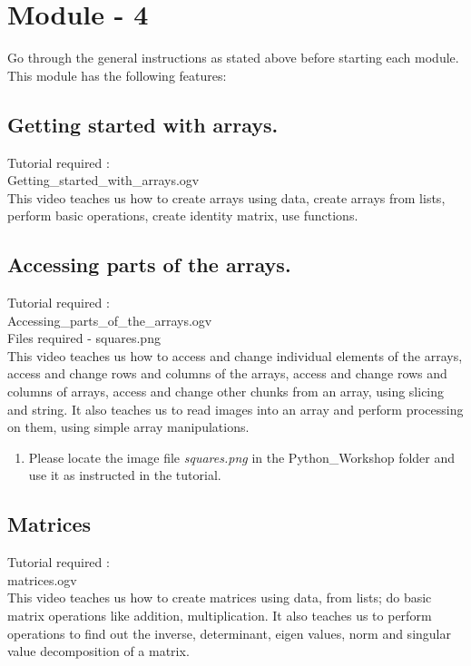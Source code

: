 \documentclass[11pt,twocolumn]{article}
\newenvironment{enumcpt}{\begin{enumerate} \topsep 0pt \partopsep 0pt 
                        \parsep 0pt
                        \itemsep 0pt \leftmargin -1in \rightmargin 0pt
                        }{\end{enumerate}}
\begin{document}
\section{Module - 4}
Go through the general instructions as stated above before starting each module.\\
This module has the following features:
\subsection{Getting started with arrays.}
Tutorial required : \\Getting\_started\_with\_arrays.ogv \\
This video teaches us how to create arrays using data, create arrays from lists, perform basic operations, create identity matrix, use functions.
\subsection{Accessing parts of the arrays.}

Tutorial required : \\Accessing\_parts\_of\_the\_arrays.ogv \\
Files required - squares.png\\
This video teaches us how to access and change individual elements of the arrays, access and change rows and columns of the arrays, access and change rows and columns of arrays, access and change other chunks from an array, using slicing and string. It also teaches us to read images into an array and perform processing on them, using simple array manipulations.
\begin{enumcpt}
\item Please locate the image file \emph{squares.png} in the Python\_Workshop folder and use it
      as instructed in the tutorial. 
\end{enumcpt}
 
\subsection{Matrices}

Tutorial required : \\matrices.ogv \\
This video teaches us how to create matrices using data, from lists; do basic matrix operations like addition, multiplication. It also teaches us to perform operations to find out the inverse, determinant, eigen values, norm and singular value decomposition of a matrix.
\end{document}

